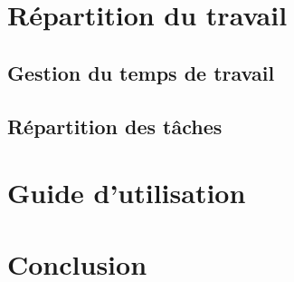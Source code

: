 \documentclass[10pt]{report}
\begin{document}
\newpage
\chapter{Répartition du travail}
\section{Gestion du temps de travail}
	\begin{figure}[hp]
	      \begin{center}
	      \end{center}
	\end{figure}
	
\section{Répartition des tâches}

\chapter{Guide d'utilisation}

\chapter*{Conclusion}
\end{document}
